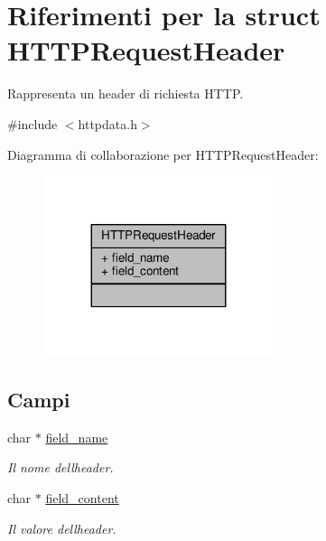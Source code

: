 \hypertarget{structHTTPRequestHeader}{}\section{Riferimenti per la struct H\+T\+T\+P\+Request\+Header}
\label{structHTTPRequestHeader}


Rappresenta un header di richiesta H\+T\+T\+P.  




{\ttfamily \#include $<$httpdata.\+h$>$}



Diagramma di collaborazione per H\+T\+T\+P\+Request\+Header\+:\nopagebreak
\begin{figure}[H]
\begin{center}
\leavevmode
\includegraphics[width=191pt]{structHTTPRequestHeader__coll__graph}
\end{center}
\end{figure}
\subsection*{Campi}
\begin{DoxyCompactItemize}
\item 
char $\ast$ \hyperlink{structHTTPRequestHeader_a9455709e6aff8eb48c42866a1a674094}{field\+\_\+name}
\begin{DoxyCompactList}\small\item\em Il nome dell\textquotesingle{}header. \end{DoxyCompactList}\item 
char $\ast$ \hyperlink{structHTTPRequestHeader_a89cbb9f9651b0866bc4f0dbd37b5e435}{field\+\_\+content}
\begin{DoxyCompactList}\small\item\em Il valore dell\textquotesingle{}header. \end{DoxyCompactList}\end{DoxyCompactItemize}


